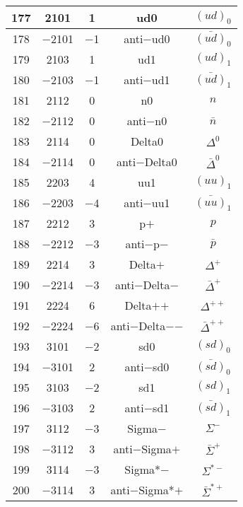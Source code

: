 \documentclass{article}
\begin{document}
\begin{table}[!htbp]
\begin{tabular}{|c|c|c|c|c|}
\hline
177 & 2101 & 1 & ud\underline{\hspace{0.6em}}0 & $(ud)_{0}$ \\
\hline
178 & $-$2101 & $-$1 & anti$-$ud\underline{\hspace{0.6em}}0 & $\bar{(ud)}_{0}$ \\
\hline
179 & 2103 & 1 & ud\underline{\hspace{0.6em}}1 & $(ud)_{1}$ \\
\hline
180 & $-$2103 & $-$1 & anti$-$ud\underline{\hspace{0.6em}}1 & $\bar{(ud)}_{1}$ \\
\hline
181 & 2112 & 0 & n0 & $n$ \\
\hline
182 & $-$2112 & 0 & anti$-$n0 & $\bar{n}$ \\
\hline
183 & 2114 & 0 & Delta0 & $\Delta^{0}$ \\
\hline
184 & $-$2114 & 0 & anti$-$Delta0 & $\bar{\Delta}^{0}$ \\
\hline
185 & 2203 & 4 & uu\underline{\hspace{0.6em}}1 & $(uu)_{1}$ \\
\hline
186 & $-$2203 & $-$4 & anti$-$uu\underline{\hspace{0.6em}}1 & $\bar{(uu)}_{1}$ \\
\hline
187 & 2212 & 3 & p$+$ & $p$ \\
\hline
188 & $-$2212 & $-$3 & anti$-$p$-$ & $\bar{p}$ \\
\hline
189 & 2214 & 3 & Delta$+$ & $\Delta^{+}$ \\
\hline
190 & $-$2214 & $-$3 & anti$-$Delta$-$ & $\bar{\Delta}^{+}$ \\
\hline
191 & 2224 & 6 & Delta$+$$+$ & $\Delta^{++}$ \\
\hline
192 & $-$2224 & $-$6 & anti$-$Delta$-$$-$ & $\bar{\Delta}^{++}$ \\
\hline
193 & 3101 & $-$2 & sd\underline{\hspace{0.6em}}0 & $(sd)_{0}$ \\
\hline
194 & $-$3101 & 2 & anti$-$sd\underline{\hspace{0.6em}}0 & $\bar{(sd)}_{0}$ \\
\hline
195 & 3103 & $-$2 & sd\underline{\hspace{0.6em}}1 & $(sd)_{1}$ \\
\hline
196 & $-$3103 & 2 & anti$-$sd\underline{\hspace{0.6em}}1 & $\bar{(sd)}_{1}$ \\
\hline
197 & 3112 & $-$3 & Sigma$-$ & $\Sigma^{-}$ \\
\hline
198 & $-$3112 & 3 & anti$-$Sigma$+$ & $\bar{\Sigma}^{+}$ \\
\hline
199 & 3114 & $-$3 & Sigma*$-$ & $\Sigma^{*-}$ \\
\hline
200 & $-$3114 & 3 & anti$-$Sigma*$+$ & $\bar{\Sigma}^{*+}$ \\
\hline
\end{tabular}
\end{table}
\end{document}
